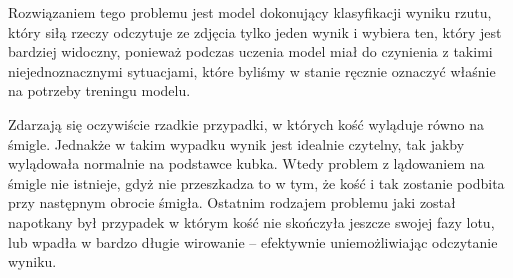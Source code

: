 Rozwiązaniem tego problemu jest model dokonujący klasyfikacji wyniku rzutu, który siłą rzeczy odczytuje ze zdjęcia tylko jeden wynik i wybiera ten,
który jest bardziej widoczny, ponieważ podczas uczenia model miał do czynienia z takimi niejednoznacznymi sytuacjami,
które byliśmy w stanie ręcznie oznaczyć właśnie na potrzeby treningu modelu.

Zdarzają się oczywiście rzadkie przypadki, w których kość wyląduje równo na śmigle. Jednakże w takim wypadku wynik jest idealnie czytelny,
tak jakby wylądowała normalnie na podstawce kubka. Wtedy problem z lądowaniem na śmigle nie istnieje,
gdyż nie przeszkadza to w tym, że kość i tak zostanie podbita przy następnym obrocie śmigła. 
Ostatnim rodzajem problemu jaki został napotkany był przypadek w którym kość nie skończyła jeszcze swojej fazy lotu,
lub wpadła w bardzo długie wirowanie -- efektywnie uniemożliwiając odczytanie wyniku.

